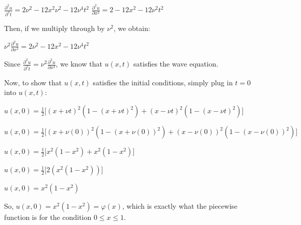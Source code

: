 \documentclass[executivepaper]{article}
\begin{document}
\begin{flushleft}
\begin{center}
$\frac{\partial^2 u}{\partial^2 t}=2\nu^2-12x^2\nu^2-12\nu^4t^2$ \quad \quad $\frac{\partial^2 u}{\partial x^2}=2-12x^2-12\nu^2t^2$

\end{center}

\vspace{3mm}

Then, if we multiply through by $\nu^2$, we obtain:

\begin{center}

$\nu^2 \frac{\partial^2 u}{\partial x^2}=2\nu^2-12x^2-12\nu^4t^2$

\end{center}

\vspace{3mm}

Since $\frac{\partial^2 u}{\partial^2 t}=\nu^2 \frac{\partial^2 u}{\partial x^2}$, we know that $u(x,t)$ satisfies the wave equation. 

\vspace{3mm}

Now, to show that $u(x,t)$ satisfies the initial conditions, simply plug in $t=0$ into $u(x,t)$:

\begin{center}

$u(x,0)=\frac{1}{2} \bigg[(x+\nu t)^2(1-(x+\nu t)^2)+(x-\nu t)^2(1-(x-\nu t)^2)\bigg]$

\vspace{3mm}

$u(x,0)=\frac{1}{2} \bigg[(x+\nu (0))^2(1-(x+\nu (0))^2)+(x-\nu (0))^2(1-(x-\nu (0))^2)\bigg]$

\vspace{3mm}

$u(x,0)=\frac{1}{2} \bigg[x^2(1-x^2)+x^2(1-x^2)\bigg]$

\pagebreak

\vspace*{-40mm}

$u(x,0)=\frac{1}{2} \bigg[2(x^2(1-x^2))\bigg]$

\vspace{3mm}

$u(x,0)=x^2(1-x^2)$

\end{center}

So, $u(x,0)=x^2(1-x^2)=\varphi(x)$, which is exactly what the piecewise function is for the condition $0 \leq x \leq 1$.

\end{flushleft}
\end{document}
